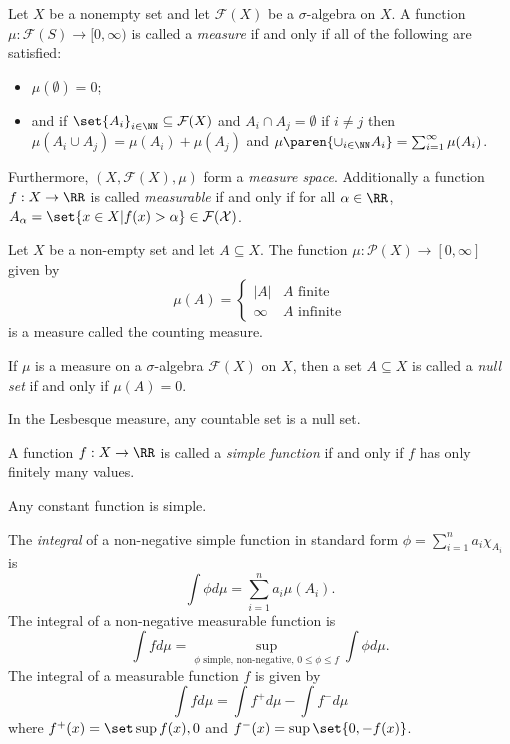 \begin{definition*}
	Let $X$ be a nonempty set and let $\mathcal{F}(X)$ be a $\sigma$-algebra on $X$.
	A function $\mu:\mathcal{F}(S)\rightarrow [0,\infty)$ is called a \textit{measure} if and only if all of the following are satisfied:
	\begin{itemize}
		\item $\mu(\emptyset)=0$;
		\item and if $\set{A_i}_{i\in\NN}\subseteq\mathcal{F}(X)$ and $A_i\cap A_j=\emptyset$ if $i\neq j$ then $\mu(A_i\cup A_j)=\mu(A_i)+\mu(A_j)$ and $\mu\paren{\cup_{i\in\NN} A_i}=\sum_{i=1}^\infty \mu(A_i)$.
	\end{itemize}
	Furthermore, $(X,\mathcal{F}(X), \mu)$ form a \textit{measure space}.
	Additionally a function $f:X\rightarrow\RR$ is called \textit{measurable} if and only if for all $\alpha\in\RR$, $A_\alpha=\set{x\in X|f(x)>\alpha}\in\mathcal{F(X)}$.
\end{definition*}
\begin{example*}
	Let $X$ be a non-empty set and let $A\subseteq X$.
	The function $\mu:\mathcal{P}(X)\rightarrow[0,\infty]$ given by
	\[
	\mu(A)=\begin{cases}
	|A| & A\text{ finite}\\
	\infty &A\text{ infinite}
	\end{cases}
	\]
	is a measure called the counting measure.
\end{example*}

\begin{definition*}
	If $\mu$ is a measure on a $\sigma$-algebra $\mathcal{F}(X)$ on $X$, then a set $A\subseteq X$ is called a \textit{null set} if and only if $\mu(A)=0$.
\end{definition*}
\begin{example*}
	In the Lesbesque measure, any countable set is a null set.
\end{example*}

\begin{definition*}
	A function $f:X\rightarrow\RR$ is called a \textit{simple function} if and only if $f$ has only finitely many values.
\end{definition*}
\begin{example*}
	Any constant function is simple.
\end{example*}

\begin{definition*}
	The \textit{integral} of a non-negative simple function in standard form $\phi=\sum_{i=1}^n a_i\chi_{A_i}$ is
	\[
		\int\phi d\mu=\sum_{i=1}^n a_i\mu(A_i).
	\]
	The integral of a non-negative measurable function is
	\[
	\int fd\mu =\sup\limits_{\phi\text{ simple, non-negative, } 0\leq\phi\leq f} \int \phi d\mu.
	\]
	The integral of a measurable function $f$ is given by
	\[
	\int f d\mu = \int f^+d\mu -\int f^-d\mu
	\]
	where $f^+(x)=\set\sup{f(x),0}$ and $f^-(x)=\sup\set{0,-f(x)}$.

\end{definition*}
